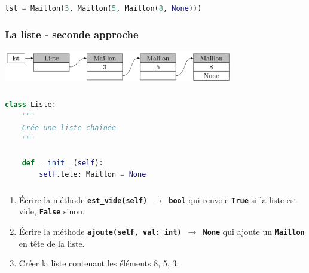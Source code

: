 \documentclass[svgnames,11pt]{beamer}
\begin{document}
\begin{frame}[fragile]
    \frametitle{}

    \begin{center}
        \begin{lstlisting}[language=Python , basicstyle=\ttfamily\small, xleftmargin=2em, xrightmargin=1em]
lst = Maillon(3, Maillon(5, Maillon(8, None)))
\end{lstlisting}
        \label{CODE}
    \end{center}

\end{frame}
\begin{frame}
    \frametitle{La liste - seconde approche}
    \begin{center}
        \centering
        \includegraphics[width=10cm]{ressources/liste2.png}
        \label{IMG}
    \end{center}

\end{frame}
\begin{frame}[fragile]
    \frametitle{}

    \begin{center}
        \begin{lstlisting}[language=Python , basicstyle=\ttfamily\small, xleftmargin=1em, xrightmargin=1em]
class Liste:
    """
    Crée une liste chaînée
    """

    def __init__(self):
        self.tete: Maillon = None
\end{lstlisting}
        \label{CODE}
    \end{center}
\end{frame}
\begin{frame}
    \frametitle{}


    \begin{activite}
        \begin{enumerate}
            \item Écrire la méthode \texttt{\textbf{est\_vide(self) $\rightarrow$ bool}} qui renvoie \textbf{\texttt{True}} si la liste est vide, \textbf{\texttt{False}} sinon.
            \item Écrire la méthode \texttt{\textbf{ajoute(self, val: int) $\rightarrow$ None}} qui ajoute un \textbf{\texttt{Maillon}} en tête de la liste.
            \item Créer la liste contenant les éléments 8, 5, 3.
        \end{enumerate}
    \end{activite}

\end{frame}
\end{document}
